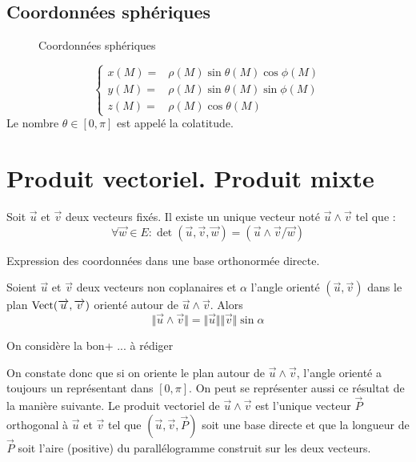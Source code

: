 \subsection{Coordonnées sphériques}
\begin{figure}[ht]
 \centering

\caption{Coordonnées sphériques}
\label{fig:C2006_2}
\end{figure}
\begin{displaymath}
 \left\lbrace 
\begin{aligned}
x(M) =& \rho(M)\sin \theta(M) \cos \phi(M) \\
y(M) =& \rho(M)\sin \theta(M) \sin \phi(M) \\
z(M) =& \rho(M)\cos \theta(M) 
 \end{aligned}
 \right. 
\end{displaymath}
Le nombre $\theta\in[0,\pi]$ est appelé la colatitude.

\section{Produit vectoriel. Produit mixte}
\begin{defi}
 Soit $\overrightarrow{u}$ et $\overrightarrow{v}$ deux vecteurs fixés. Il existe un unique vecteur noté $\overrightarrow{u} \wedge \overrightarrow{v}$ tel que :
\begin{displaymath}
 \forall \overrightarrow w \in E : \det(\overrightarrow u , \overrightarrow v , \overrightarrow w)
=  \left(  \overrightarrow u \wedge \overrightarrow v / \overrightarrow w \right) 
\end{displaymath}
\end{defi}

Expression des coordonnées dans une base orthonormée directe.
\begin{prop}
 Soient $\overrightarrow u$ et $\overrightarrow v$ deux vecteurs non coplanaires et $\alpha$ l'angle orienté $(\overrightarrow u , \overrightarrow v)$ dans le plan $\mathop{\mathrm{Vect}}(\overrightarrow u , \overrightarrow v)$ orienté autour de $\overrightarrow u \wedge \overrightarrow v$. Alors
\begin{displaymath}
 \Vert \overrightarrow u \wedge \overrightarrow v\Vert =
 \Vert \overrightarrow u \Vert  \Vert\overrightarrow v\Vert \sin \alpha
\end{displaymath}
\end{prop}
\begin{demo}
 On considère la bon+ ... à rédiger
\end{demo}
\begin{rem}
 On constate donc que si on oriente le plan autour de $\overrightarrow u \wedge \overrightarrow v$, l'angle orienté a toujours un représentant dans $[0,\pi]$. On peut se représenter aussi ce résultat de la manière suivante. Le produit vectoriel de $\overrightarrow u \wedge \overrightarrow v$ est l'unique vecteur $\overrightarrow P$ orthogonal à $\overrightarrow u$ et $\overrightarrow v$ tel que $(\overrightarrow u, \overrightarrow v, \overrightarrow P)$ soit une base directe et que la longueur de $\overrightarrow P$ soit l'aire (positive) du parallélogramme construit sur les deux vecteurs.
\end{rem}


